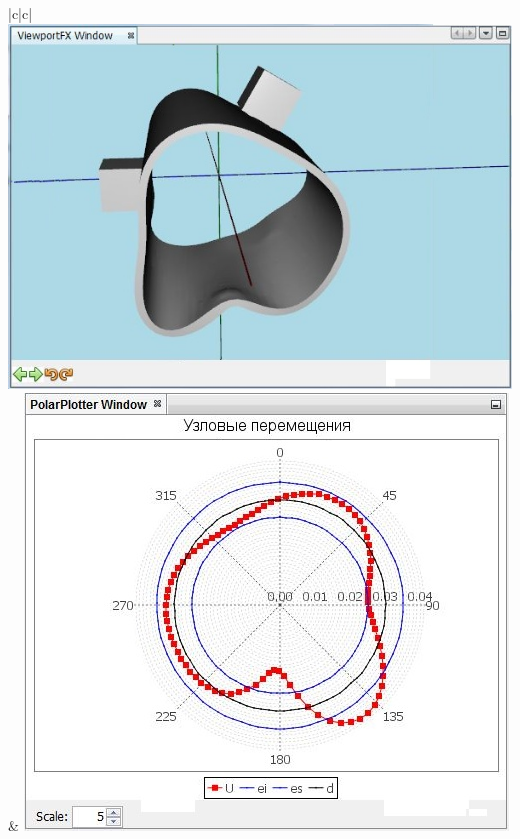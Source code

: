 \documentclass[14pt,oneside,final]{extreport}
\begin{document}
\begin{table}[]
{{\begin{tabu}[]{|c|c|}
					\includegraphics[scale=0.55]{img/simulation-force-test-model2} & \includegraphics[scale=0.55]{img/simulation-force-test-graph2}  \\ 
					\hline
					 \\ \hline

\end{tabu}}}
\end{table}
\end{document}
